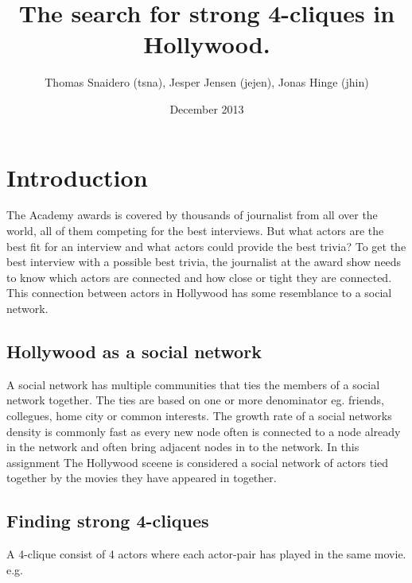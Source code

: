 \documentclass{article}
\title{The search for strong 4-cliques in Hollywood.}
\author{Thomas Snaidero (tsna), Jesper Jensen (jejen), Jonas Hinge (jhin)}
\date{December 2013}
\begin{document}
\maketitle

\section{Introduction}
The Academy awards is covered by thousands of journalist from all over the world, all of them competing for the best interviews. But what actors are the best fit for an interview and what actors could provide the best trivia?
To get the best interview with a possible best trivia, the journalist at the award show needs to know which actors are connected and how close or tight they are connected. This connection between actors in Hollywood has some resemblance to a social network.

\subsection{Hollywood as a social network}
A social network has multiple communities that ties the members of a social network together. The ties are based on one or more denominator eg. friends, collegues, home city or common interests.
The growth rate of a social networks density is commonly fast as every new node often is connected to a node already in the network and often bring adjacent nodes in to the network. In this assignment The Hollywood sceene is considered a social network of actors tied together by the movies they have appeared in together.

\subsection{Finding strong 4-cliques}
A 4-clique consist of 4 actors where each actor-pair has played in the same movie. e.g. 
\end{document}
